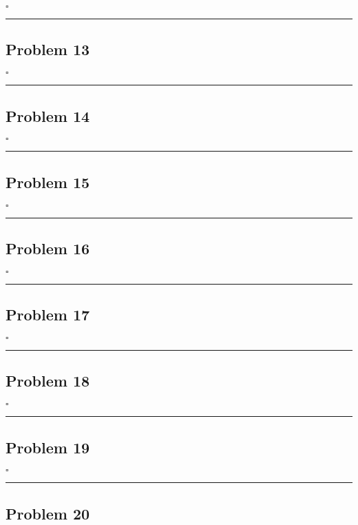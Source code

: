 \documentclass[12pt]{article}
\newcommand*{\QEDB}{\hfill\ensuremath{\square}}
\newcommand{\horrule}[1]{\rule{\linewidth}{#1}}
\begin{document}
\QEDB

\horrule{0.5pt}

\subsection*{Problem 13}

\QEDB

\horrule{0.5pt}

\subsection*{Problem 14}

\QEDB

\horrule{0.5pt}

\subsection*{Problem 15}

\QEDB

\horrule{0.5pt}

\subsection*{Problem 16}

\QEDB

\horrule{0.5pt}

\subsection*{Problem 17}

\QEDB

\horrule{0.5pt}

\subsection*{Problem 18}

\QEDB

\horrule{0.5pt}

\subsection*{Problem 19}

\QEDB

\horrule{0.5pt}

\subsection*{Problem 20}
\end{document}
